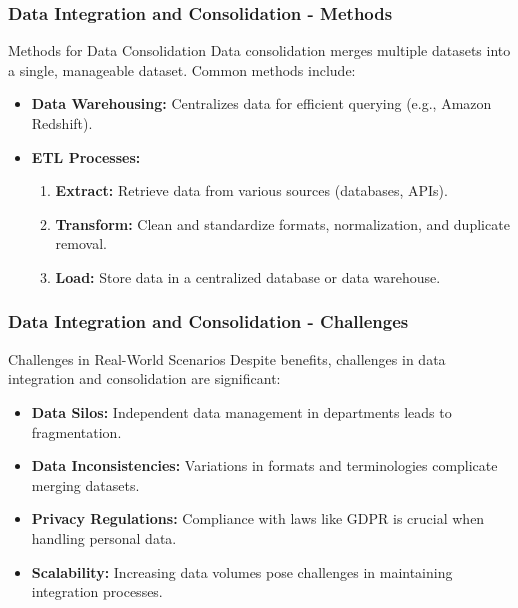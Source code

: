 \documentclass[aspectratio=169]{beamer}
\begin{document}
\begin{frame}[fragile]
    \frametitle{Data Integration and Consolidation - Methods}
    \begin{block}{Methods for Data Consolidation}
        Data consolidation merges multiple datasets into a single, manageable dataset. Common methods include:
    \end{block}
    \begin{itemize}
        \item \textbf{Data Warehousing:} Centralizes data for efficient querying (e.g., Amazon Redshift).
        \item \textbf{ETL Processes:}
        \begin{enumerate}
            \item \textbf{Extract:} Retrieve data from various sources (databases, APIs).
            \item \textbf{Transform:} Clean and standardize formats, normalization, and duplicate removal.
            \item \textbf{Load:} Store data in a centralized database or data warehouse.
        \end{enumerate}
    \end{itemize}
\end{frame}

\begin{frame}[fragile]
    \frametitle{Data Integration and Consolidation - Challenges}
    \begin{block}{Challenges in Real-World Scenarios}
        Despite benefits, challenges in data integration and consolidation are significant:
    \end{block}
    \begin{itemize}
        \item \textbf{Data Silos:} Independent data management in departments leads to fragmentation.
        \item \textbf{Data Inconsistencies:} Variations in formats and terminologies complicate merging datasets.
        \item \textbf{Privacy Regulations:} Compliance with laws like GDPR is crucial when handling personal data.
        \item \textbf{Scalability:} Increasing data volumes pose challenges in maintaining integration processes.
    \end{itemize}
\end{frame}
\end{document}
